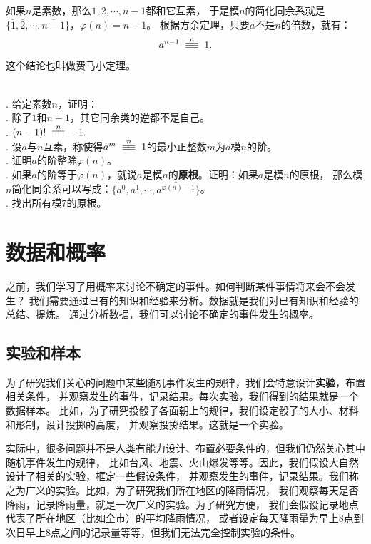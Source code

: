 \documentclass[12pt,UTF8]{ctexbook}
\begin{document}
如果$n$是素数，那么$1,2, \cdots , n-1$都和它互素，
于是模$n$的简化同余系就是$\{\overline{1},\overline{2}, \cdots , \overline{n-1}\}$，$\varphi(n) = n-1$。
根据方余定理，只要$a$不是$n$的倍数，就有：
$$ a^{n-1} \tong{n} 1 .$$
这个结论也叫做费马小定理。

\begin{xt}\label{xt:3-3-0}
    \mbox{}\\
    . 给定素数$n$，证明：\\
    . 除了$\overline{1}$和$\overline{n-1}$，其它同余类的逆都不是自己。\\
    . $(n-1)! \tong{n} -1.$ \\
    . 设$a$与$n$互素，称使得$a^m \tong{n} 1$的最小正整数$m$为$a$模$n$的\textbf{阶}。\\
    . 证明$a$的阶整除$\varphi(n)$。\\
    . 如果$a$的阶等于$\varphi(n)$，就说$a$是模$n$的\textbf{原根}。证明：如果$a$是模$n$的原根，
    那么模$n$简化同余系可以写成：$\{\overline{a^0}, \overline{a^1}, \cdots , \overline{a^{\varphi(n)-1}}\}$。\\
    . 找出所有模$7$的原根。
\end{xt}

\chapter{数据和概率}
之前，我们学习了用概率来讨论不确定的事件。如何判断某件事情将来会不会发生？
我们需要通过已有的知识和经验来分析。数据就是我们对已有知识和经验的总结、提炼。
通过分析数据，我们可以讨论不确定的事件发生的概率。

\section{实验和样本}
为了研究我们关心的问题中某些随机事件发生的规律，我们会特意设计\textbf{实验}，布置相关条件，
并观察发生的事件，记录结果。每次实验，我们得到的结果就是一个数据样本。
比如，为了研究投骰子各面朝上的规律，我们设定骰子的大小、材料和形制，设计投掷的高度，
并观察投掷结果。这就是一个实验。

实际中，很多问题并不是人类有能力设计、布置必要条件的，但我们仍然关心其中随机事件发生的规律，
比如台风、地震、火山爆发等等。因此，我们假设大自然设计了相关的实验，框定一些假设条件，
并观察发生的事件，记录结果。我们称之为广义的实验。比如，为了研究我们所在地区的降雨情况，
我们观察每天是否降雨，记录降雨量，就是一次广义的实验。为了研究方便，
我们会假设记录地点代表了所在地区（比如全市）的平均降雨情况，
或者设定每天降雨量为早上$8$点到次日早上$8$点之间的记录量等等，但我们无法完全控制实验的条件。
\end{document}
